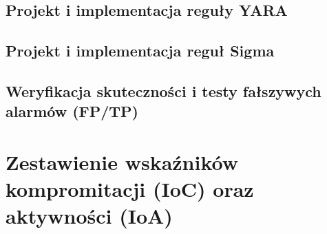 \subsection{Projekt i implementacja reguły YARA}\label{subsec:cs2_regula_yara}

\subsection{Projekt i implementacja reguł Sigma}\label{subsec:cs2_regula_sigma}

\subsection{Weryfikacja skuteczności i testy fałszywych alarmów (FP/TP)}\label{subsec:cs2_walidacja}

\section{Zestawienie wskaźników kompromitacji (IoC) oraz aktywności (IoA)}\label{sec:cs2_ioc_ioa}


